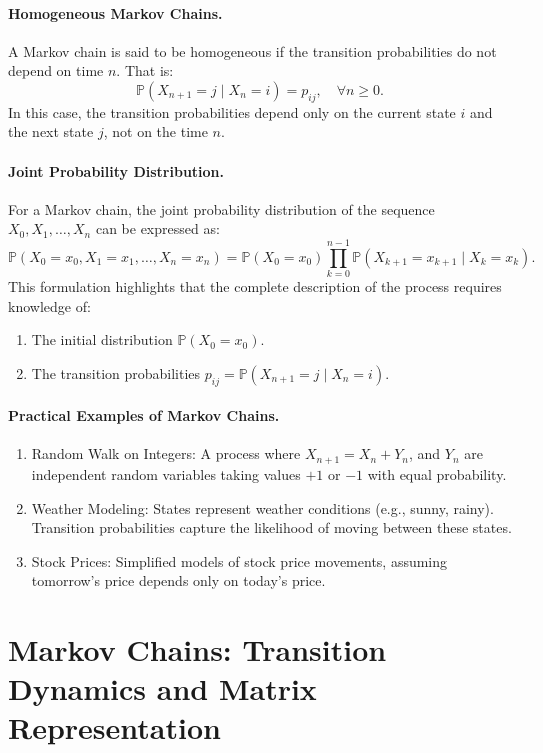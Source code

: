 \paragraph{Homogeneous Markov Chains.}
A Markov chain is said to be homogeneous if the transition probabilities do not depend on time \( n \). That is:
\[
\mathbb{P}(X_{n+1} = j \mid X_n = i) = p_{ij}, \quad \forall n \geq 0.
\]
In this case, the transition probabilities depend only on the current state \( i \) and the next state \( j \), not on the time \( n \).

\paragraph{Joint Probability Distribution.}
For a Markov chain, the joint probability distribution of the sequence \( X_0, X_1, \dots, X_n \) can be expressed as:
\[
\mathbb{P}(X_0 = x_0, X_1 = x_1, \dots, X_n = x_n) = \mathbb{P}(X_0 = x_0) \prod_{k=0}^{n-1} \mathbb{P}(X_{k+1} = x_{k+1} \mid X_k = x_k).
\]
This formulation highlights that the complete description of the process requires knowledge of:
\begin{enumerate}
    \item The initial distribution \( \mathbb{P}(X_0 = x_0) \).
    \item The transition probabilities \( p_{ij} = \mathbb{P}(X_{n+1} = j \mid X_n = i) \).
\end{enumerate}

\paragraph{Practical Examples of Markov Chains.}
\begin{enumerate}
    \item Random Walk on Integers: A process where \( X_{n+1} = X_n + Y_n \), and \( Y_n \) are independent random variables taking values \( +1 \) or \( -1 \) with equal probability.
    \item Weather Modeling: States represent weather conditions (e.g., sunny, rainy). Transition probabilities capture the likelihood of moving between these states.
    \item Stock Prices: Simplified models of stock price movements, assuming tomorrow's price depends only on today's price.
\end{enumerate}

\section{Markov Chains: Transition Dynamics and Matrix Representation}

